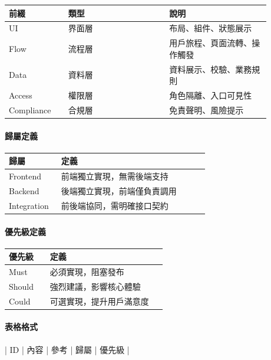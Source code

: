 \begingroup
\small
\begin{longtable}{L{0.20\linewidth}L{0.34\linewidth}L{0.34\linewidth}}
\toprule
\textbf{前綴} & \textbf{類型} & \textbf{說明} \\
\midrule
UI & 界面層 & 布局、組件、狀態展示 \\
Flow & 流程層 & 用戶旅程、頁面流轉、操作觸發 \\
Data & 資料層 & 資料展示、校驗、業務規則 \\
Access & 權限層 & 角色隔離、入口可見性 \\
Compliance & 合規層 & 免責聲明、風險提示 \\
\bottomrule
\end{longtable}
\endgroup

\paragraph{歸屬定義}

\begingroup
\small
\begin{longtable}{L{0.24\linewidth}L{0.68\linewidth}}
\toprule
\textbf{歸屬} & \textbf{定義} \\
\midrule
Frontend & 前端獨立實現，無需後端支持 \\
Backend & 後端獨立實現，前端僅負責調用 \\
Integration & 前後端協同，需明確接口契約 \\
\bottomrule
\end{longtable}
\endgroup

\paragraph{優先級定義}

\begingroup
\small
\begin{longtable}{L{0.24\linewidth}L{0.68\linewidth}}
\toprule
\textbf{優先級} & \textbf{定義} \\
\midrule
Must & 必須實現，阻塞發布 \\
Should & 強烈建議，影響核心體驗 \\
Could & 可選實現，提升用戶滿意度 \\
\bottomrule
\end{longtable}
\endgroup

\paragraph{表格格式}

\begin{codeblock}
| ID | 內容 | 參考 | 歸屬 | 優先級 |
\end{codeblock}

